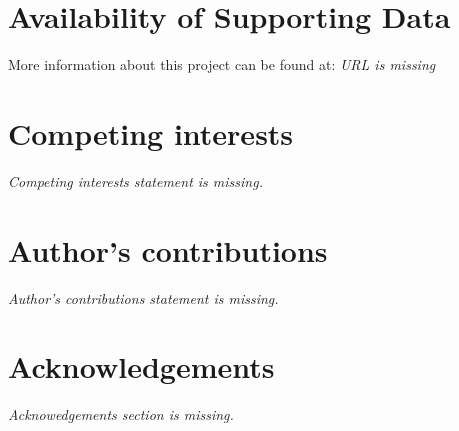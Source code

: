\documentclass[twocolumn]{bmcart}%
\begin{document}
\begin{backmatter}

\section*{Availability of Supporting Data}
More information about this project can be found at: \emph{URL is missing} 

\section*{Competing interests}
\emph{Competing interests statement is missing.}

\section*{Author's contributions}
\emph{Author's contributions statement is missing.}

\section*{Acknowledgements}
\emph{Acknowedgements section is missing.}

  
  


\end{backmatter}
\end{document}
